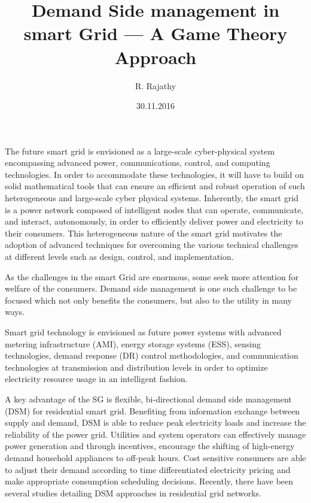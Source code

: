 \documentclass[12pt,twoside]{article}
\title{Demand Side management in smart Grid --- A Game Theory Approach}
\author{R. Rajathy}
\date{30.11.2016}
\begin{document}
  \maketitle
  \thispagestyle{empty}
  \onehalfspacing
  The future smart grid is envisioned as a large-scale cyber-physical system encompassing advanced power, communications, control, and computing technologies. In order to accommodate these technologies, it will have to build on solid mathematical tools that can ensure an efficient and robust operation of such heterogeneous and large-scale cyber physical systems. Inherently, the smart grid is a power network composed of intelligent nodes that can operate, communicate, and interact, autonomously, in order to efficiently deliver power and electricity to their consumers. This heterogeneous nature of the smart grid motivates the adoption of advanced techniques for overcoming the various technical challenges at different levels such as design, control, and implementation.

As the challenges in the smart Grid are enormous, some seek more attention for welfare of the consumers. Demand side management is one such challenge to be focused which not only benefits the consumers, but also to the utility in many ways.

Smart grid technology is envisioned as future power systems with advanced metering infrastructure (AMI), energy storage systems (ESS), sensing technologies, demand response (DR) control methodologies, and communication technologies at transmission and distribution levels in order to optimize electricity resource usage in an intelligent fashion.

A key advantage of the SG is flexible, bi-directional demand side management (DSM) for residential smart grid. Benefiting from information exchange between supply and demand, DSM is able to reduce peak electricity loads and increase the reliability of the power grid. Utilities and system operators can effectively manage power generation and through incentives, encourage the shifting of high-energy demand household appliances to off-peak hours. Cost sensitive consumers are able to adjust their demand according to time differentiated electricity pricing and make appropriate consumption scheduling decisions. Recently, there have been several studies detailing DSM approaches in residential grid networks.
\end{document}
